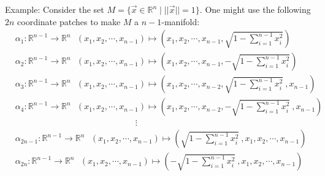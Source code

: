 \documentclass[15pt]{book}
\theoremstyle{break}
\theoremstyle{break}
\newcommand{\R}{\mathbb{R}}
\newcommand{\example}{\color{green}Example: \color{black}}
\begin{document}
\example Consider the set $M=\{ \vec{x}\in \R^n \mid ||\vec{x}||=1\}$. One might use the following $2n$ coordinate patches to make $M$ a $n-1$-manifold:
\begin{align*}
&\alpha_1: \R^{n-1} \to \R^n \ \ \ (x_1,x_2,\cdots, x_{n-1})\mapsto \left(x_1,x_2,\cdots, x_{n-1}, \sqrt{1-\sum_{i=1}^{n-1} x_i^2}\right)\\
&\alpha_2: \R^{n-1} \to \R^n \ \ \ (x_1,x_2,\cdots, x_{n-1})\mapsto \left(x_1,x_2,\cdots, x_{n-1}, -\sqrt{1-\sum_{i=1}^{n-1} x_i^2}\right)\\
&\alpha_3: \R^{n-1} \to \R^n \ \ \ (x_1,x_2,\cdots, x_{n-1})\mapsto \left(x_1,x_2,\cdots, x_{n-2}, \sqrt{1-\sum_{i=1}^{n-1} x_i^2}\ , x_{n-1}\right)\\
&\alpha_4: \R^{n-1} \to \R^n \ \ \ (x_1,x_2,\cdots, x_{n-1})\mapsto \left(x_1,x_2,\cdots,x_{n-2}, -\sqrt{1-\sum_{i=1}^{n-1} x_i^2}\ ,x_{n-1}\right)\\
&{}\qquad\qquad\qquad\qquad\qquad\qquad\qquad\vdots\\
&\alpha_{2n-1}: \R^{n-1} \to \R^n \ \ \ (x_1,x_2,\cdots, x_{n-1})\mapsto \left(\sqrt{1-\sum_{i=1}^{n-1} x_i^2}\ ,x_1,x_2,\cdots, x_{n-1}\right)\\
&\alpha_{2n}: \R^{n-1} \to \R^n \ \ \ (x_1,x_2,\cdots, x_{n-1})\mapsto \left(-\sqrt{1-\sum_{i=1}^{n-1} x_i^2}\ ,x_1,x_2,\cdots, x_{n-1}\right)\\
\end{align*}
\end{document}

